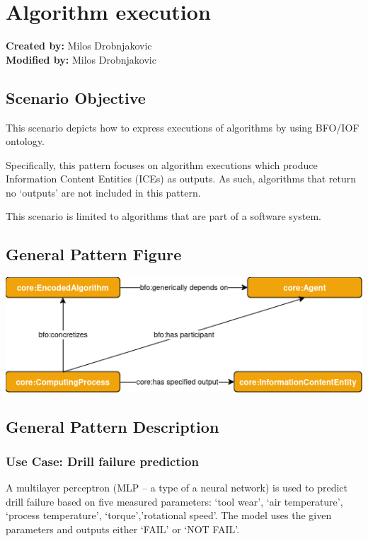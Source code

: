 \section{Algorithm execution}
\label{sec-algorithm-execution}

\textbf{Created by:} Milos Drobnjakovic \\
\textbf{Modified by:} Milos Drobnjakovic \\

\subsection*{Scenario Objective}

This scenario depicts how to express executions of algorithms by using BFO/IOF ontology.

Specifically, this pattern focuses on algorithm executions which produce Information Content Entities (ICEs) as outputs. As such, algorithms that return no ‘outputs’ are not included in this pattern.

This scenario is limited to algorithms that are part of a software system.


\subsection*{General Pattern Figure}
\includegraphics[scale=0.6]{scenarios/algorithm-execution/images/algorithm-execution-general.png}

\subsection*{General Pattern Description}

\subsubsection*{Use Case: Drill failure prediction} 
A multilayer perceptron (MLP – a type of a neural network) is used to predict drill failure based on five measured parameters: ‘tool wear’, ‘air temperature’, ‘process temperature’, ‘torque’,’rotational speed’. The model uses the given parameters and outputs either ‘FAIL’ or ‘NOT FAIL’.

